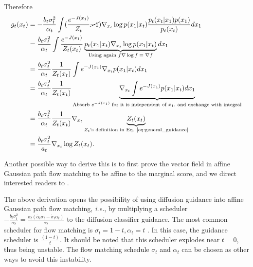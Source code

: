 Therefore 
\begin{align}
    \nonumber g_t(x_t) & = -\frac{b_t \sigma_t^2}{\alpha_t} \int (\frac{e^{-J(x_1)}}{Z_t} \cancel{-1})  \nabla_{x_t} \log p(x_1 | x_t) \frac{p_t(x_t|x_1)p(x_1)}{p_t(x_t)} dx_1 \\
    \nonumber& = \frac{b_t \sigma_t^2}{\alpha_t} \int \frac{e^{-J(x_1)}}{Z_t(x_t)} \underbrace{p_t(x_1|x_t) \nabla_{x_t} \log p(x_1 | x_t)}_{\text{Using again $f \nabla \log f = \nabla f$}}  dx_1 \\
    \nonumber& = \frac{b_t \sigma_t^2}{\alpha_t} \frac{1}{Z_t(x_t)} \int e^{-J(x_1)} \nabla_{x_t} p(x_1 | x_t)  dx_1 \\
    \nonumber& = \frac{b_t \sigma_t^2}{\alpha_t} \frac{1}{Z_t(x_t)}\underbrace{\nabla_{x_t} \int e^{-J(x_1)} p(x_1 | x_t)  dx_1}_{\text{Absorb $e^{-J(x_1)}$ for it is independent of $x_1$, and exchange with integral}} \\
    \nonumber& = \frac{b_t \sigma_t^2}{\alpha_t} \frac{1}{Z_t(x_t)} \nabla_{x_t} \underbrace{Z_t(x_t)}_{\text{$Z_t$'s definition in Eq. \eqref{eq:general_guidance}}} \\
    & = \frac{b_t \sigma_t^2}{a_t} \nabla_{x_t} \log Z_t(x_t).
\end{align}

Another possible way to derive this is to first prove the vector field in affine Gaussian path flow matching to be affine to the marginal score, and we direct interested readers to \citep{zheng_guided_2023}. 

\begin{remark}
    The above derivation opens the possibility of using diffusion guidance into affine Gaussian path flow matching, \emph{i.e.}, by multiplying a scheduler $-\frac{b_t \sigma_t^2}{\alpha_t} = \frac{\sigma_t(\dot\alpha_t\sigma_t - \dot \sigma_t\alpha_t)}{\alpha_t} $ to the diffusion classifier guidance. The most common scheduler for flow matching is $\sigma_t = 1 - t, \alpha_t = t$ \citep{lipman_flow_2023,pokle_training-free_2024,zheng_guided_2023,tong_improving_2024,liu_flow_2022,lipman_flow_2024}. In this case, the guidance scheduler is $\frac{(1-t)}{t}$. It should be noted that this scheduler explodes near $t=0$, thus being unstable. The flow matching schedule $\sigma_t$ and $\alpha_t$ can be chosen as other ways to avoid this instability.
\end{remark} 

